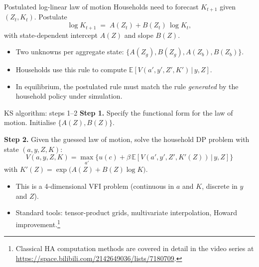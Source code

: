 \begin{frame}{Postulated log-linear law of motion}
Households need to forecast $K_{t+1}$ given $(Z_t, K_t)$. Postulate
\[
\log K_{t+1} \;=\; A(Z_t) + B(Z_t)\,\log K_t,
\]
with state-dependent intercept $A(Z)$ and slope $B(Z)$.
\medskip
\begin{itemize}
\item Two unknowns per aggregate state: $\{A(Z_g), B(Z_g), A(Z_b), B(Z_b)\}$.
\item Households use this rule to compute $\mathbb{E}[V(a',y',Z',K')\,|\,y,Z]$.
\item In equilibrium, the postulated rule must match the rule \emph{generated} by the household policy under simulation.
\end{itemize}
\end{frame}

\begin{frame}{KS algorithm: steps 1--2}
\textbf{Step 1.} Specify the functional form for the law of motion. Initialise $\{A(Z), B(Z)\}$.
\medskip

\textbf{Step 2.} Given the guessed law of motion, solve the household DP problem with state $(a,y,Z,K)$:
\[
V(a,y,Z,K) = \max_{a'}\!\big\{u(c) + \beta\,\mathbb{E}\!\left[V(a',y',Z',K'(Z))\,|\,y,Z\right]\big\}
\]
with $K'(Z) = \exp\!\big(A(Z) + B(Z)\log K\big)$.
\medskip
\begin{itemize}
\item This is a 4-dimensional VFI problem (continuous in $a$ and $K$, discrete in $y$ and $Z$).
\item Standard tools: tensor-product grids, multivariate interpolation, Howard improvement.\footnote{\scriptsize Classical HA computation methods are covered in detail in the video series at \url{https://space.bilibili.com/2142649036/lists/7180709}.}
\end{itemize}
\end{frame}

